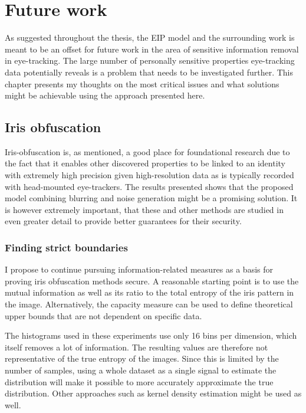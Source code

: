 \chapter{Future work}
As suggested throughout the thesis, the EIP model and the surrounding work is meant to be an offset for future work in the area of sensitive information removal in eye-tracking. The large number of personally sensitive properties eye-tracking data potentially reveals is a problem that needs to be investigated further. This chapter presents my thoughts on the most critical issues and what solutions might be achievable using the approach presented here.



\section{Iris obfuscation}
Iris-obfuscation is, as mentioned, a good place for foundational research due to the fact that it enables other discovered properties to be linked to an identity with extremely high precision given high-resolution data as is typically recorded with head-mounted eye-trackers. The results presented shows that the proposed model combining blurring and noise generation might be a promising solution. It is however extremely important, that these and other methods are studied in even greater detail to provide better guarantees for their security. 


\subsection{Finding strict boundaries}
I propose to continue pursuing information-related measures as a basis for proving iris obfuscation methods secure. A reasonable starting point is to use the mutual information as well as its ratio to the total entropy of the iris pattern in the image. Alternatively, the capacity measure can be used to define theoretical upper bounds that are not dependent on specific data.

The histograms used in these experiments use only 16 bins per dimension, which itself removes a lot of information. The resulting values are therefore not representative of the true entropy of the images. Since this is limited by the number of samples, using a whole dataset as a single signal to estimate the distribution will make it possible to more accurately approximate the true distribution. Other approaches such as kernel density estimation might be used as well.

